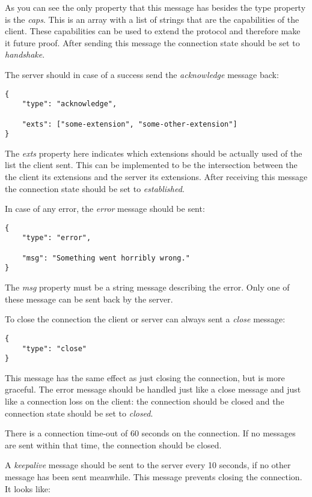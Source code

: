 \documentclass[11pt,a4paper]{article}
\begin{document}
As you can see the only property that this message has besides the type property is the \textit{caps}.
This is an array with a list of strings that are the capabilities of the client.
These capabilities can be used to extend the protocol and therefore make it future proof.
After sending this message the connection state should be set to \textit{handshake}.

The server should in case of a success send the \textit{acknowledge} message back:

\begin{verbatim}
{
    "type": "acknowledge",

    "exts": ["some-extension", "some-other-extension"]
}
\end{verbatim}

The \textit{exts} property here indicates which extensions should be actually used of the list the client sent.
This can be implemented to be the intersection between the the client its extensions and the server its extensions.
After receiving this message the connection state should be set to \textit{established}.

In case of any error, the \textit{error} message should be sent:

\begin{verbatim}
{
    "type": "error",

    "msg": "Something went horribly wrong."
}
\end{verbatim}

The \textit{msg} property must be a string message describing the error.
Only one of these message can be sent back by the server.

To close the connection the client or server can always sent a \textit{close} message:

\begin{verbatim}
{
    "type": "close"
}
\end{verbatim}

This message has the same effect as just closing the connection, but is more graceful.
The error message should be handled just like a close message and just like a connection loss on the client: the connection should be closed and the connection state should be set to \textit{closed}.

There is a connection time-out of 60 seconds on the connection.
If no messages are sent within that time, the connection should be closed.

A \textit{keepalive} message should be sent to the server every 10 seconds, if no other message has been sent meanwhile.
This message prevents closing the connection. It looks like:
\end{document}
